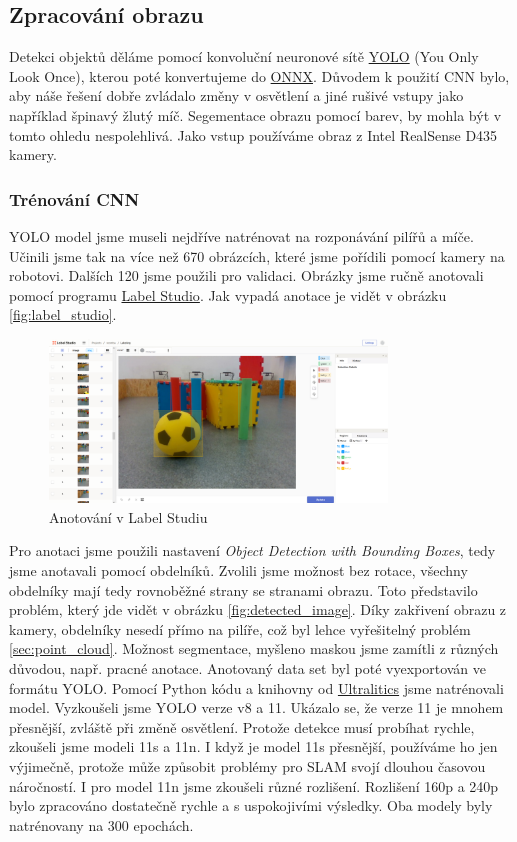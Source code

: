 \documentclass[a4paper,12pt]{article}
\begin{document}
\subsection{Zpracování obrazu}
Detekci objektů děláme pomocí konvoluční neuronové sítě \href{https://docs.ultralytics.com/models/}{YOLO} (You Only Look Once), kterou poté konvertujeme do \href{https://onnx.ai/}{ONNX}. Důvodem k použití CNN bylo, aby náše řešení dobře zvládalo změny v osvětlení a jiné rušivé vstupy jako například špinavý žlutý míč. Segementace obrazu pomocí barev, by mohla být v tomto ohledu nespolehlivá. Jako vstup používáme obraz z Intel RealSense D435 kamery.
\subsubsection{Trénování CNN}
YOLO model jsme museli nejdříve natrénovat na rozponávání pilířů a míče. Učinili jsme tak na více než 670 obrázcích,
které jsme pořídili pomocí kamery na robotovi. Dalších 120 jsme použili pro validaci. Obrázky jsme ručně anotovali pomocí programu \href{https://labelstud.io/}{Label Studio}. Jak vypadá anotace je vidět v obrázku \eqref{fig:label_studio}.
\begin{figure}[H]
    \centering
    \includegraphics[width=0.8\textwidth]{pictures/label_studio.png}
    \caption{Anotování v Label Studiu}
    \label{fig:label_studio}	
\end{figure}
Pro anotaci jsme použili nastavení \textit{Object Detection with Bounding Boxes}, tedy jsme anotavali pomocí obdelníků. Zvolili jsme možnost bez rotace, všechny obdelníky mají tedy rovnoběžné strany se stranami obrazu. 
Toto představilo problém, který jde vidět v obrázku \eqref{fig:detected_image}. Díky zakřivení obrazu z kamery, obdelníky nesedí přímo na pilíře, což byl lehce vyřešitelný problém \eqref{sec:point_cloud}. Možnost segmentace, myšleno maskou jsme zamítli z různých důvodou, např. pracné anotace. 
Anotovaný data set byl poté vyexportován ve formátu YOLO.
Pomocí Python kódu a knihovny od \href{https://docs.ultralytics.com/}{Ultralitics} jsme natrénovali model. Vyzkoušeli jsme YOLO verze v8 a 11. Ukázalo se, že verze 11 je mnohem přesnější, zvláště při změně osvětlení. 
Protože detekce musí probíhat rychle, zkoušeli jsme modeli 11s a 11n. I když je model 11s přesnější, používáme ho jen výjimečně, protože může způsobit problémy pro SLAM svojí dlouhou časovou náročností. 
I pro model 11n jsme zkoušeli různé rozlišení. Rozlišení 160p a 240p bylo zpracováno dostatečně rychle a s uspokojivími výsledky. Oba modely byly natrénovany na 300 epochách.
\end{document}
